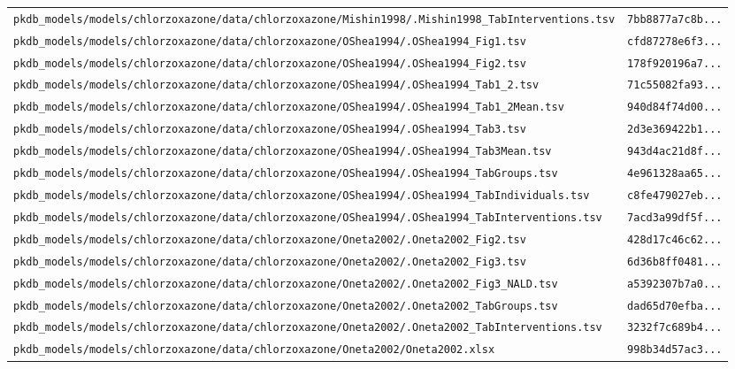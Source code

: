 \begin{longtable}{ll}
\texttt{pkdb\_models/models/chlorzoxazone/data/chlorzoxazone/Mishin1998/.Mishin1998\_TabInterventions.tsv} & \texttt{7bb8877a7c8b...} \\
\texttt{pkdb\_models/models/chlorzoxazone/data/chlorzoxazone/OShea1994/.OShea1994\_Fig1.tsv} & \texttt{cfd87278e6f3...} \\
\texttt{pkdb\_models/models/chlorzoxazone/data/chlorzoxazone/OShea1994/.OShea1994\_Fig2.tsv} & \texttt{178f920196a7...} \\
\texttt{pkdb\_models/models/chlorzoxazone/data/chlorzoxazone/OShea1994/.OShea1994\_Tab1\_2.tsv} & \texttt{71c55082fa93...} \\
\texttt{pkdb\_models/models/chlorzoxazone/data/chlorzoxazone/OShea1994/.OShea1994\_Tab1\_2Mean.tsv} & \texttt{940d84f74d00...} \\
\texttt{pkdb\_models/models/chlorzoxazone/data/chlorzoxazone/OShea1994/.OShea1994\_Tab3.tsv} & \texttt{2d3e369422b1...} \\
\texttt{pkdb\_models/models/chlorzoxazone/data/chlorzoxazone/OShea1994/.OShea1994\_Tab3Mean.tsv} & \texttt{943d4ac21d8f...} \\
\texttt{pkdb\_models/models/chlorzoxazone/data/chlorzoxazone/OShea1994/.OShea1994\_TabGroups.tsv} & \texttt{4e961328aa65...} \\
\texttt{pkdb\_models/models/chlorzoxazone/data/chlorzoxazone/OShea1994/.OShea1994\_TabIndividuals.tsv} & \texttt{c8fe479027eb...} \\
\texttt{pkdb\_models/models/chlorzoxazone/data/chlorzoxazone/OShea1994/.OShea1994\_TabInterventions.tsv} & \texttt{7acd3a99df5f...} \\
\texttt{pkdb\_models/models/chlorzoxazone/data/chlorzoxazone/Oneta2002/.Oneta2002\_Fig2.tsv} & \texttt{428d17c46c62...} \\
\texttt{pkdb\_models/models/chlorzoxazone/data/chlorzoxazone/Oneta2002/.Oneta2002\_Fig3.tsv} & \texttt{6d36b8ff0481...} \\
\texttt{pkdb\_models/models/chlorzoxazone/data/chlorzoxazone/Oneta2002/.Oneta2002\_Fig3\_NALD.tsv} & \texttt{a5392307b7a0...} \\
\texttt{pkdb\_models/models/chlorzoxazone/data/chlorzoxazone/Oneta2002/.Oneta2002\_TabGroups.tsv} & \texttt{dad65d70efba...} \\
\texttt{pkdb\_models/models/chlorzoxazone/data/chlorzoxazone/Oneta2002/.Oneta2002\_TabInterventions.tsv} & \texttt{3232f7c689b4...} \\
\texttt{pkdb\_models/models/chlorzoxazone/data/chlorzoxazone/Oneta2002/Oneta2002.xlsx} & \texttt{998b34d57ac3...} \\

\end{longtable}
